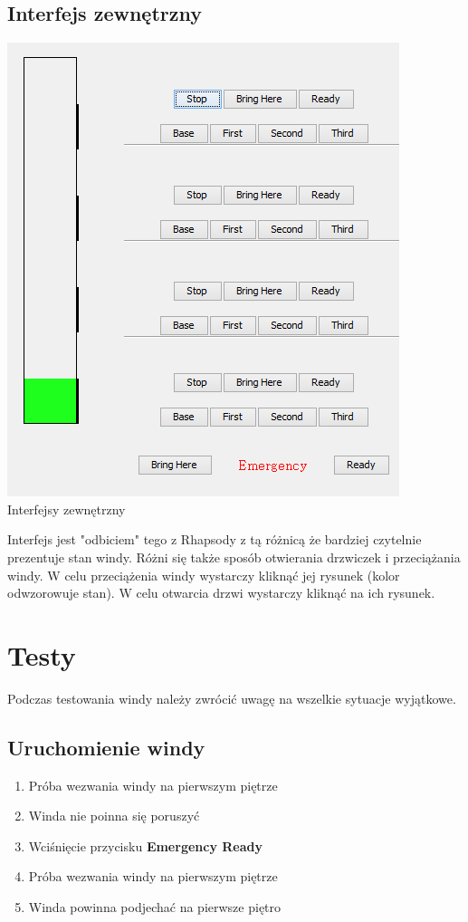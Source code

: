 \documentclass[a4paper,11pt]{article}
\begin{document}
	\subsection{Interfejs zewnętrzny}
	\begin{center} 
    		\includegraphics{images/oGui.PNG} \\Interfejsy zewnętrzny\\ 
  	\end{center} 
  	
  	Interfejs jest "odbiciem" tego z Rhapsody z tą różnicą że bardziej czytelnie prezentuje stan windy. Różni się także sposób otwierania 
  	drzwiczek i przeciążania windy. W celu przeciążenia windy wystarczy kliknąć jej rysunek (kolor odwzorowuje stan). W celu otwarcia drzwi 
  	wystarczy kliknąć na ich rysunek.

	
	
	
\section{Testy}
	Podczas testowania windy należy zwrócić uwagę na wszelkie sytuacje wyjątkowe.
	
	\subsection{Uruchomienie windy}
		\begin{enumerate}
			\item Próba wezwania windy na pierwszym piętrze
			\item Winda nie poinna się poruszyć
			\item Wciśnięcie przycisku \textbf{Emergency Ready}
			\item Próba wezwania windy na pierwszym piętrze 
			\item Winda powinna podjechać na pierwsze piętro
		\end{enumerate}
\end{document}
